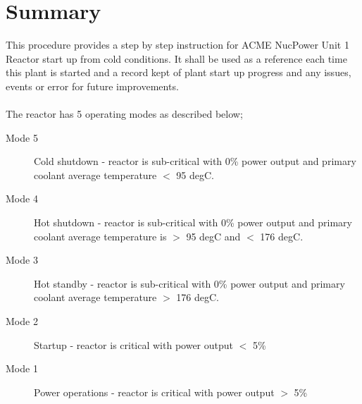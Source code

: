 \documentclass[10pt,a4paper]{article}
\begin{document}
\section*{Summary}
This procedure provides a step by step instruction for ACME NucPower Unit 1 Reactor start up from cold conditions. It shall be used as a reference each time this plant is started and a record kept of plant start up progress and any issues, events or error for future improvements.\\
\\
The reactor has 5 operating modes as described below;
\begin{description}
\item[Mode 5] Cold shutdown - reactor is sub-critical with 0\% power output and primary coolant average temperature $<$ 95 degC.
\item[Mode 4] Hot shutdown - reactor is sub-critical with 0\% power output and primary coolant average temperature is $>$ 95 degC and $<$ 176 degC.
\item[Mode 3] Hot standby - reactor is sub-critical with 0\% power output and primary coolant average temperature $>$ 176 degC.
\item[Mode 2] Startup - reactor is critical with power output $<$ 5\%
\item[Mode 1] Power operations - reactor is critical with power output $>$ 5\%
\end{description}
\end{document}
